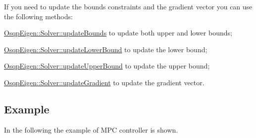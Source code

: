 If you need to update the bounds constraints and the gradient vector you can use the following methods\+:
\begin{DoxyItemize}
\item {\ttfamily \mbox{\hyperlink{classOsqpEigen_1_1Solver_a1af39f37500a6bad6896e8e6699880fa}{Osqp\+Eigen\+::\+Solver\+::update\+Bounds}}} to update both upper and lower bounds;
\item {\ttfamily \mbox{\hyperlink{classOsqpEigen_1_1Solver_a48764153cec5e618021ab79586cc71b6}{Osqp\+Eigen\+::\+Solver\+::update\+Lower\+Bound}}} to update the lower bound;
\item {\ttfamily \mbox{\hyperlink{classOsqpEigen_1_1Solver_a69f1db45e10dae9c186cc0561532f018}{Osqp\+Eigen\+::\+Solver\+::update\+Upper\+Bound}}} to update the upper bound;
\item {\ttfamily \mbox{\hyperlink{classOsqpEigen_1_1Solver_a7d1d9fdd8db3201a0ca2dcafbc289eea}{Osqp\+Eigen\+::\+Solver\+::update\+Gradient}}} to update the gradient vector.
\end{DoxyItemize}\hypertarget{index_results}{}\subsection{Example}\label{index_results}
In the following the example of M\+PC controller is shown. 
